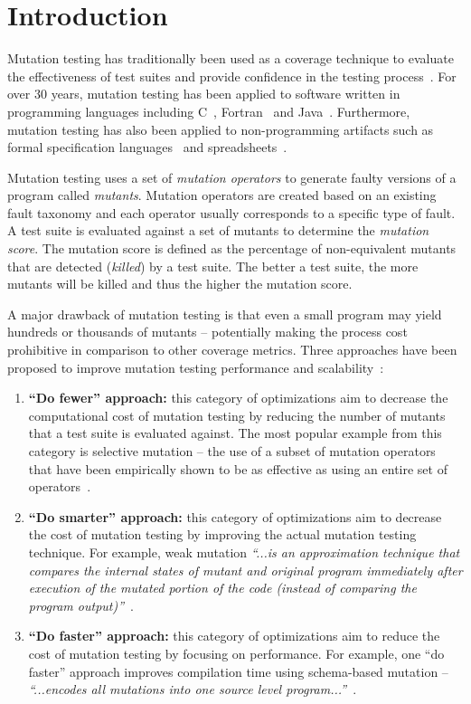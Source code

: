 \chapter{Introduction}
\label{chap:introduction}
Mutation testing has traditionally been used as a coverage technique to evaluate the effectiveness of test suites and provide confidence in the testing process~\cite{DLS78, JH10}. For over 30 years, mutation testing has been applied to software written in programming languages including C~\cite{DM96, JH08}, Fortran~\cite{KO91} and Java~\cite{MKO02, BCD06}. Furthermore, mutation testing has also been applied to non-programming artifacts such as formal specification languages~\cite{ABM98} and spreadsheets~\cite{AE09}.

Mutation testing uses a set of \emph{mutation operators} to generate faulty versions of a program called \emph{mutants}. Mutation operators are created based on an existing fault taxonomy and each operator usually corresponds to a specific type of fault. A test suite is evaluated against a set of mutants to determine the \emph{mutation score}. The mutation score is defined as the percentage of non-equivalent mutants that are detected (\emph{killed}) by a test suite. The better a test suite, the more mutants will be killed and thus the higher the mutation score.

A major drawback of mutation testing is that even a small program may yield hundreds or thousands of mutants -- potentially making the process cost prohibitive in comparison to other coverage metrics. Three approaches have been proposed to improve mutation testing performance and scalability~\cite{OU00}:

\begin{enumerate}
  \item \textbf{``Do fewer'' approach:} this category of optimizations aim to decrease the computational cost of mutation testing by reducing the number of mutants that a test suite is evaluated against. The most popular example from this category is selective mutation -- the use of a subset of mutation operators that have been empirically shown to be as effective as using an entire set of operators~\cite{OLR+96}.

  \item \textbf{``Do smarter'' approach:} this category of optimizations aim to decrease the cost of mutation testing by improving the actual mutation testing technique. For example, weak mutation \emph{``...is an approximation technique that compares the internal states of mutant and original program immediately after execution of the mutated portion of the code (instead of comparing the program output)''}~\cite{OU00}.

  \item \textbf{``Do faster'' approach:} this category of optimizations aim to reduce the cost of mutation testing by focusing on performance. For example, one ``do faster'' approach improves compilation time using schema-based mutation -- \emph{``...encodes all mutations into one source level program...''}~\cite{OU00}.
\end{enumerate}

